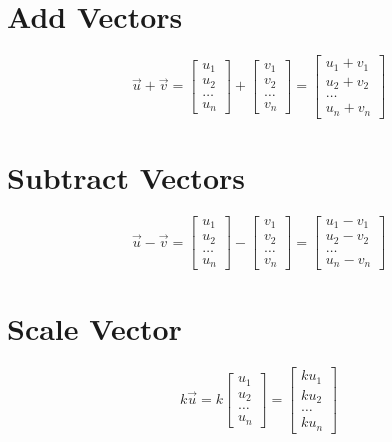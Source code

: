 \documentclass{article}
\begin{document}
\section{Add Vectors}
\[
\vec{u} + \vec{v} =
\begin{bmatrix}
	u_1 \\
	u_2 \\
	\dots \\
	u_n
\end{bmatrix} +
\begin{bmatrix}
	v_1 \\
	v_2 \\
	\dots \\
	v_n
\end{bmatrix} =
\begin{bmatrix}
	u_1 + v_1 \\
	u_2 + v_2 \\
	\dots \\
	u_n + v_n
\end{bmatrix}
\]
\section{Subtract Vectors}
\[
\vec{u} - \vec{v} =
\begin{bmatrix}
	u_1 \\
	u_2 \\
	\dots \\
	u_n
\end{bmatrix} -
\begin{bmatrix}
	v_1 \\
	v_2 \\
	\dots \\
	v_n
\end{bmatrix} =
\begin{bmatrix}
	u_1 - v_1 \\
	u_2 - v_2 \\
	\dots \\
	u_n - v_n
\end{bmatrix}
\]
\section{Scale Vector}
\[
k\vec{u} =
k
\begin{bmatrix}
	u_1 \\
	u_2 \\
	\dots \\
	u_n
\end{bmatrix}=
\begin{bmatrix}
	ku_1 \\
	ku_2 \\
	\dots \\
	ku_n
\end{bmatrix}
\]
\end{document}
